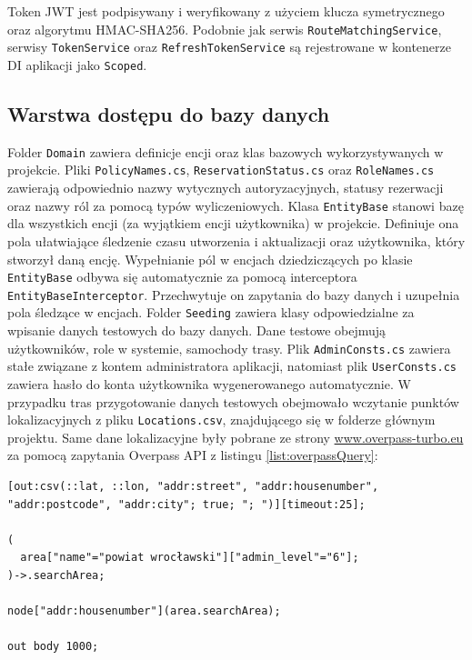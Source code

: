 Token JWT jest podpisywany i weryfikowany z użyciem klucza symetrycznego oraz algorytmu HMAC-SHA256.
Podobnie jak serwis \texttt{RouteMatchingService}, serwisy \texttt{TokenService} oraz \texttt{RefreshTokenService} są rejestrowane w kontenerze DI aplikacji jako \texttt{Scoped}.
\subsection{Warstwa dostępu do bazy danych}
Folder \texttt{Domain} zawiera definicje encji oraz klas bazowych wykorzystywanych w projekcie.
Pliki \texttt{PolicyNames.cs}, \texttt{ReservationStatus.cs} oraz \texttt{RoleNames.cs} zawierają odpowiednio nazwy wytycznych autoryzacyjnych, statusy rezerwacji oraz nazwy ról za pomocą typów wyliczeniowych.
Klasa \texttt{EntityBase} stanowi bazę dla wszystkich encji (za wyjątkiem encji użytkownika) w projekcie. 
Definiuje ona pola ułatwiające śledzenie czasu utworzenia i aktualizacji oraz użytkownika, który stworzył daną encję.
Wypełnianie pól w encjach dziedziczących po klasie \texttt{EntityBase} odbywa się automatycznie za pomocą interceptora \texttt{EntityBaseInterceptor}.
Przechwytuje on zapytania do bazy danych i uzupełnia pola śledzące w encjach.
Folder \texttt{Seeding} zawiera klasy odpowiedzialne za wpisanie danych testowych do bazy danych.
Dane testowe obejmują użytkowników, role w systemie, samochody trasy.
Plik \texttt{AdminConsts.cs} zawiera stałe związane z kontem administratora aplikacji, natomiast plik \texttt{UserConsts.cs} zawiera hasło do konta użytkownika wygenerowanego automatycznie.
W przypadku tras przygotowanie danych testowych obejmowało wczytanie punktów lokalizacyjnych z pliku \texttt{Locations.csv}, znajdującego się w folderze głównym projektu.
Same dane lokalizacyjne były pobrane ze strony \url{www.overpass-turbo.eu} za pomocą zapytania Overpass API z listingu \ref{list:overpassQuery}:

\begin{lstlisting}[label=list:overpassQuery,caption=Zapytanie Overpass API do pobrania danych lokalizacyjnyUżytkownik przy uruchomieniu aplikacji trafia na stronę głównąch,style=overpassstyle]
[out:csv(::lat, ::lon, "addr:street", "addr:housenumber", "addr:postcode", "addr:city"; true; "; ")][timeout:25];

(
  area["name"="powiat wrocławski"]["admin_level"="6"];
)->.searchArea;

node["addr:housenumber"](area.searchArea);

out body 1000;
\end{lstlisting}

